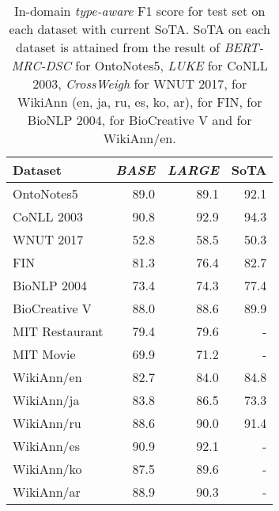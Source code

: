 \documentclass[11pt,a4paper]{article}
\begin{document}
\begin{table}
\centering
\begin{tabular}{lrrr}
\hline
\textbf{Dataset} & \textit{BASE} & \textit{LARGE} & \textbf{SoTA} \\\hline
OntoNotes5       & 89.0 & 89.1 & 92.1 \\\hline
CoNLL 2003       & 90.8 & 92.9 & 94.3 \\\hline
WNUT 2017        & 52.8 & 58.5 & 50.3 \\\hline
FIN              & 81.3 & 76.4 & 82.7 \\\hline
BioNLP 2004      & 73.4 & 74.3 & 77.4 \\\hline
BioCreative V    & 88.0 & 88.6 & 89.9 \\\hline
MIT Restaurant   & 79.4 & 79.6 & -    \\\hline
MIT Movie        & 69.9 & 71.2 & -    \\\hline
WikiAnn/en       & 82.7 & 84.0 & 84.8 \\\hline
WikiAnn/ja       & 83.8 & 86.5 & 73.3 \\\hline
WikiAnn/ru       & 88.6 & 90.0 & 91.4 \\\hline
WikiAnn/es       & 90.9 & 92.1 & -    \\\hline
WikiAnn/ko       & 87.5 & 89.6 & -    \\\hline
WikiAnn/ar       & 88.9 & 90.3 & -    \\\hline
\end{tabular}
\caption{\label{in-domain-result}
In-domain \textit{type-aware} F1 score
for test set on each dataset with current SoTA. 
SoTA on each dataset is attained from the result of
{\it BERT-MRC-DSC} \citep{li2019dice} for OntoNotes5,
{\it LUKE} \citep{yamada-etal-2020-luke} for CoNLL 2003,
{\it CrossWeigh} \citep{wang2019crossweigh} for WNUT 2017,
\citep{pfeiffer2020mad} for WikiAnn (en, ja, ru, es, ko, ar),
\citep{salinas-alvarado-etal-2015-domain} for FIN,
\citep{lee2020biobert} for BioNLP 2004,
\citep{nooralahzadeh2019reinforcement} for BioCreative V
and \citep{pfeiffer2020mad} for WikiAnn/en.
}
\end{table}
\end{document}
